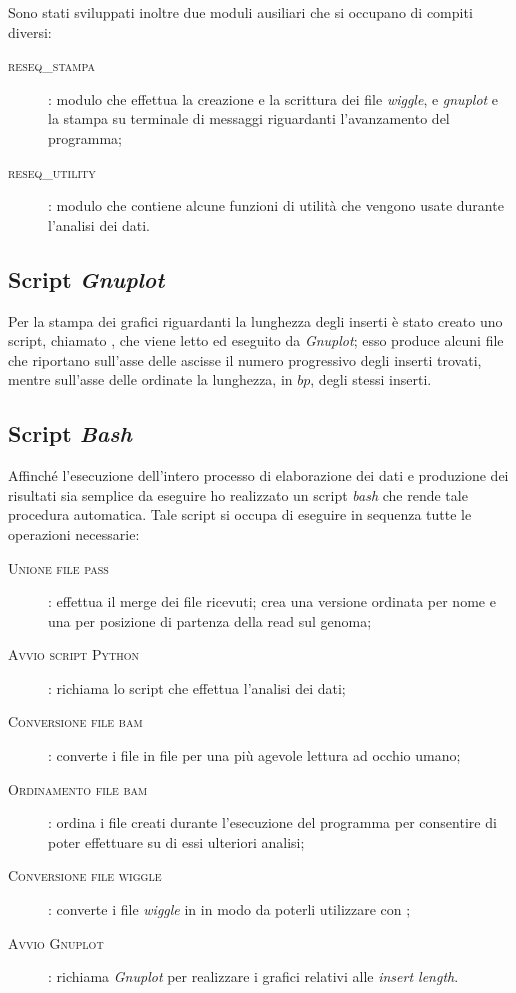 Sono stati sviluppati inoltre due moduli ausiliari che si occupano di compiti diversi:
\begin{description}
\item[\textsc{reseq\_stampa}]: modulo che effettua la creazione e la scrittura dei file \emph{wiggle},  e \emph{gnuplot} e la stampa su terminale di messaggi riguardanti l'avanzamento del programma;

\item[\textsc{reseq\_utility}]: modulo che contiene alcune funzioni di utilità che vengono usate durante l'analisi dei dati.
\end{description}

\subsection{Script \emph{Gnuplot}}
Per la stampa dei grafici riguardanti la lunghezza degli inserti è stato creato uno script, chiamato , che viene letto ed eseguito da \emph{Gnuplot}; esso produce alcuni file  che riportano sull'asse delle ascisse il numero progressivo degli inserti trovati, mentre sull'asse delle ordinate la lunghezza, in $bp$, degli stessi inserti.

\subsection{Script \emph{Bash}}
\label{sec:bash}
Affinché l'esecuzione dell'intero processo di elaborazione dei dati e produzione dei risultati sia semplice da eseguire ho realizzato un script \emph{bash} che rende tale procedura automatica.
Tale script si occupa di eseguire in sequenza tutte le operazioni necessarie:

\begin{description}
\item[\textsc{Unione file pass}]: effettua il merge dei file  ricevuti; crea una versione ordinata per nome e una per posizione di partenza della read sul genoma;
\item[\textsc{Avvio script Python}]: richiama lo script  che effettua l'analisi dei dati;
\item[\textsc{Conversione file bam}]: converte i file  in file  per una più agevole lettura ad occhio umano;
\item[\textsc{Ordinamento file bam}]: ordina i file  creati durante l'esecuzione del programma per consentire di poter effettuare su di essi ulteriori analisi;
\item[\textsc{Conversione file wiggle}]: converte i file \emph{wiggle} in  in modo da poterli utilizzare con ;
\item[\textsc{Avvio Gnuplot}]: richiama \emph{Gnuplot} per realizzare i grafici relativi alle \emph{insert length}.
\end{description}




